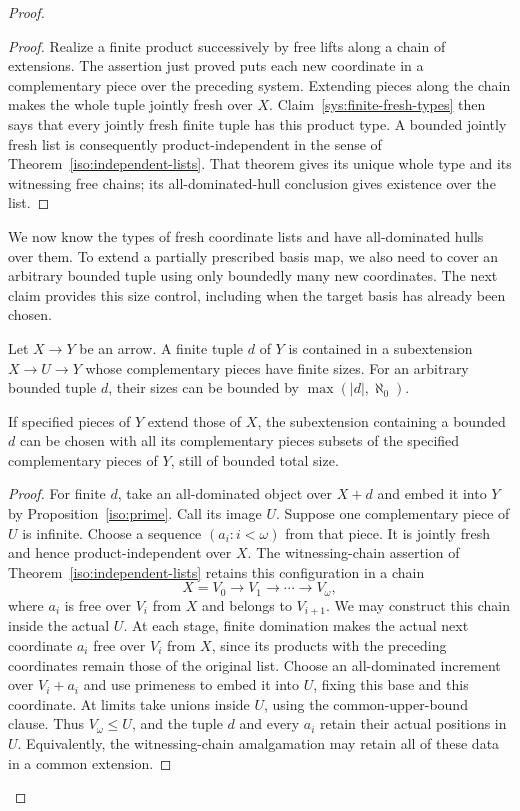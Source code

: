 \begin{proof}
\begin{proof}
Realize a finite product successively by free lifts along a
chain of extensions.  The assertion just proved puts each
new coordinate in a complementary piece over the preceding
system.  Extending pieces along the chain makes the whole
tuple jointly fresh over $X$.  Claim~\ref{sys:finite-fresh-types}
then says that every jointly fresh finite tuple has this
product type.  A bounded jointly fresh list is consequently
product-independent in the sense of
Theorem~\ref{iso:independent-lists}.  That theorem gives
its unique whole type and its witnessing free chains; its
all-dominated-hull conclusion gives existence over the list.
\end{proof}

We now know the types of fresh coordinate lists and have all-dominated
hulls over them.  To extend a partially prescribed basis map, we also
need to cover an arbitrary bounded tuple using only boundedly many
new coordinates.  The next claim provides this size control, including
when the target basis has already been chosen.

\begin{claim}
\label{sys:rank-cost}
Let $X\to Y$ be an arrow.  A finite tuple $d$ of $Y$ is
contained in a subextension $X\to U\to Y$ whose complementary
pieces have finite sizes.  For an arbitrary bounded tuple
$d$, their sizes can be bounded by
$\max(|d|,\aleph_0)$.

If specified pieces of $Y$ extend those of $X$, the subextension
containing a bounded $d$ can be chosen with all its
complementary pieces subsets of the specified complementary
pieces of $Y$, still of bounded total size.
\end{claim}

\begin{proof}
For finite $d$, take an all-dominated object over $X+d$ and
embed it into $Y$ by Proposition~\ref{iso:prime}.  Call its
image $U$.  Suppose one complementary piece of $U$ is
infinite.  Choose a sequence $(a_i:i<\omega)$ from that piece.
It is jointly fresh and hence product-independent over $X$.
The witnessing-chain assertion of
Theorem~\ref{iso:independent-lists} retains this
configuration in a chain
\[
 X=V_0\longrightarrow V_1\longrightarrow\cdots
 \longrightarrow V_\omega,
\]
where $a_i$ is free over $V_i$ from $X$ and belongs to
$V_{i+1}$.  We may construct this chain inside the actual $U$.  At each stage,
finite domination makes the actual next coordinate $a_i$ free over
$V_i$ from $X$, since its products with the preceding coordinates
remain those of the original list.  Choose an all-dominated increment
over $V_i+a_i$ and use primeness to embed it into $U$, fixing this
base and this coordinate.  At limits take unions inside $U$, using
the common-upper-bound clause.  Thus $V_\omega\leq U$, and the tuple
$d$ and every $a_i$ retain their actual positions in $U$.  Equivalently,
the witnessing-chain amalgamation may retain all of these data in a
common extension.


\end{proof}
\end{proof}
